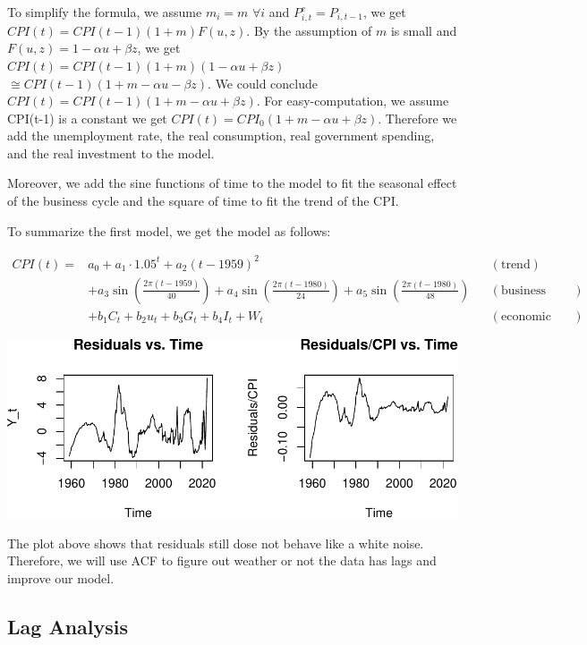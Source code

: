 \documentclass[
  man,floatsintext,
  man]{apa6}
\begin{document}
To simplify the formula, we assume \(m_i = m \,\, \forall i\) and \(P_{i,t}^e = P_{i,t-1}\), we get \(CPI(t) = CPI(t-1) (1+m) F(u,z)\).
By the assumption of \(m\) is small and \(F(u,z) = 1 - \alpha u + \beta z\), we get \(CPI(t) = CPI(t-1) (1+m) (1 - \alpha u + \beta z)\) \(\cong CPI(t-1) ( 1 + m - \alpha u - \beta z)\).
We could conclude \(CPI(t)=CPI(t-1)(1 + m - \alpha u + \beta z)\).
For easy-computation, we assume CPI(t-1) is a constant we get \(CPI(t)=CPI_0(1 + m - \alpha u + \beta z)\).
Therefore we add the unemployment rate, the real consumption, real government spending, and the real investment to the model.

Moreover, we add the sine functions of time to the model to fit the seasonal effect of the business cycle and the square of time to fit the trend of the CPI.

To summarize the first model, we get the model as follows:

\begin{align*}
CPI(t) =& a_0 + a_1 \cdot 1.05^t  + a_2 (t-1959)^2 && (\text{trend})\\
& + a_3 \sin\left(\frac{2\pi(t-1959)}{40}\right) + a_4 \sin\left(\frac{2\pi(t-1980)}{24}\right) + a_5 \sin\left(\frac{2\pi(t-1980)}{48}\right) && (\text{business cycle})\\
& + b_1 C_t + b_2 u_t + b_3 G_t + b_4 I_t + W_t && (\text{economic variables})
\end{align*}

\includegraphics{stat429_group2_final_proj_files/figure-latex/unnamed-chunk-3-1.pdf}

The plot above shows that residuals still dose not behave like a white noise.
Therefore, we will use ACF to figure out weather or not the data has lags and improve our model.

\hypertarget{lag-analysis}{%
\subsection{Lag Analysis}\label{lag-analysis}}
\end{document}
